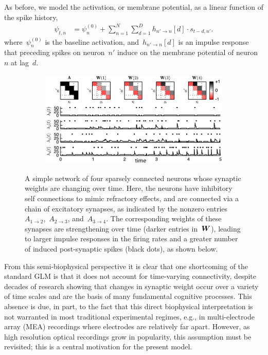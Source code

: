 As before, we model the activation, or membrane potential,
 as a linear function of the spike history,
\begin{align}
  \label{eqn:glm_rate}
  \psi_{t,n} &= \psi_n^{(0)} + \sum_{n=1}^N \sum_{d=1}^D h_{n' \to n}[d] \cdot s_{t-d, n'}.
\end{align}
where~$\psi_n^{(0)}$ is the baseline activation,  and~$h_{n'\to n}[d]$
is an impulse response that preceding spikes on
neuron~$n'$ induce on the membrane potential of neuron~$n$ at lag~$d$. 

\begin{figure}[t!]
  \centering
  \begin{subfigure}[T]{5.25in}
    \includegraphics[width=\textwidth]{figures/ch4/figure1}    
  \end{subfigure}
  \caption[A simple example of a GLM with time-varying synaptic weights]{
    A simple network of four sparsely connected neurons whose
    synaptic weights are changing over time. Here, the neurons have
    inhibitory self connections to mimic refractory effects, and are
    connected via a chain of excitatory synapses, as indicated by the
    nonzero entries~$A_{1\to 2}$,~$A_{2 \to 3}$, and~$A_{3\to 4}$. The
    corresponding weights of these synapses are strengthening over time
    (darker entries in~$\boldsymbol{W}$), leading to larger impulse responses in
    the firing rates and a greater number of induced post-synaptic
    spikes (black dots), as shown below.}
  \label{fig:model_illustration}
\end{figure}

From this semi-biophysical perspective it is clear that one
shortcoming of the standard GLM is that it does not account for
time-varying connectivity, despite decades of research showing that
changes in synaptic weight occur over a variety of time scales and are
the basis of many fundamental cognitive processes. This absence is
due, in part, to the fact that this direct biophysical interpretation
is not warranted in most traditional experimental regimes, e.g., in
multi-electrode array (MEA) recordings where electrodes are relatively
far apart.  However, as high resolution optical recordings grow in
popularity, this assumption must be revisited; this is a central
motivation for the present model.

